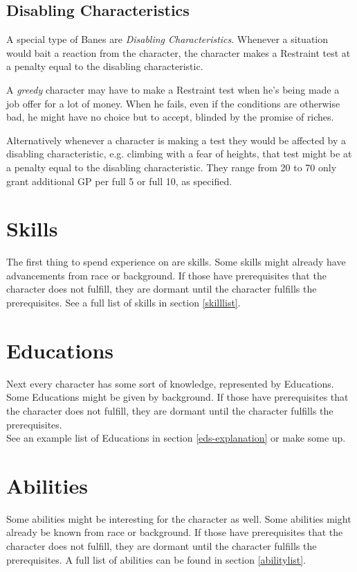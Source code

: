 \documentclass[12pt,a4paper,openany,dvipsnames]{book}
\begin{document}
	\subsection{Disabling Characteristics}
	A special type of Banes are \emph{Disabling Characteristics}.
	Whenever a situation would bait a reaction from the character,
		the character makes a Restraint test at a penalty equal to the disabling characteristic.
		\begin{exampleblock}
			A \emph{greedy} character may have to make a Restraint test
				when he's being made a job offer for a lot of money.
			When he fails, even if the conditions are otherwise bad,
				he might have no choice but to accept,
				blinded by the promise of riches.
		\end{exampleblock}
	Alternatively whenever a character is making a test they would be affected by a disabling characteristic, e.g. climbing with a fear of heights, that test might be at a penalty equal to the disabling characteristic. They range from 20 to 70 only grant additional GP per full 5 or full 10, as specified.

	\section{Skills}
	The first thing to spend experience on are skills. Some skills might already have advancements from race or background. If those have prerequisites that the character does not fulfill, they are dormant until the character fulfills the prerequisites. See a full list of skills in section \ref{skilllist}.
	\section{Educations}
	Next every character has some sort of knowledge, represented by Educations.
	Some Educations might be given by background.
	If those have prerequisites that the character does not fulfill,
		they are dormant until the character fulfills the prerequisites.\\
	See an example list of Educations in section \ref{eds-explanation} or make some up.
	\section{Abilities}
	Some abilities might be interesting for the character as well. Some abilities might already be known from race or background. If those have prerequisites that the character does not fulfill, they are dormant until the character fulfills the prerequisites. A full list of abilities can be found in section \ref{abilitylist}.
\end{document}
